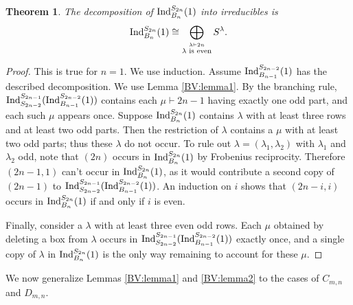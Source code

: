 \documentclass[12pt]{amsart}
\newtheorem{theorem}{Theorem}
\numberwithin{theorem}{section}
\newcommand{\Ind}{\textup{Ind}}
\begin{document}
\begin{theorem}\label{BV:theorem1}
The decomposition of $\Ind_{B_n}^{S_{2n}}(1)$ into irreducibles is 
$$\Ind_{B_n}^{S_{2n}}(1) \cong \bigoplus_{\stackrel{\lambda \vdash 2n}{\lambda  \textup{ is even}}} S^\lambda.$$
\end{theorem}
\begin{proof}
This is true for $n=1$. We use induction. Assume $\Ind_{B_{n-1}}^{S_{2n-2}}(1)$ has the described decomposition. We use Lemma \ref{BV:lemma1}. By the branching rule, $\Ind^{S_{2n-1}}_{S_{2n-2}}(\Ind_{B_{n-1}}^{S_{2n-2}}(1))$ contains each $\mu \vdash 2n-1$ having exactly one odd part, and each such $\mu$ appears once. Suppose $\Ind_{B_n}^{S_{2n}}(1)$ contains $\lambda$ with at least three rows and at least two odd parts. Then the restriction of $\lambda$ contains a $\mu$ with at least two odd parts; thus these $\lambda$ do not occur. To rule out $\lambda=(\lambda_1,\lambda_2)$ with $\lambda_1$ and $\lambda_2$ odd, note that $(2n)$ occurs in $\Ind_{B_n}^{S_{2n}}(1)$ by Frobenius reciprocity. Therefore $(2n-1,1)$ can't occur in $\Ind_{B_n}^{S_{2n}}(1)$, as it would contribute a second copy of $(2n-1)$ to $\Ind^{S_{2n-1}}_{S_{2n-2}}(\Ind_{B_{n-1}}^{S_{2n-2}}(1))$. An induction on $i$ shows that $(2n-i,i)$ occurs in $\Ind_{B_n}^{S_{2n}}(1)$ if and only if $i$ is even.

Finally, consider a $\lambda$ with at least three even odd rows. Each $\mu$ obtained by deleting a box from $\lambda$ occurs in $\Ind^{S_{2n-1}}_{S_{2n-2}}(\Ind_{B_{n-1}}^{S_{2n-2}}(1))$ exactly once, and a single copy of $\lambda$ in $\Ind_{B_n}^{S_{2n}}(1)$ is the only way remaining to account for these $\mu$.
\end{proof}

We now generalize Lemmas \ref{BV:lemma1} and \ref{BV:lemma2} to the cases of $C_{m,n}$ and $D_{m,n}$.
\end{document}
